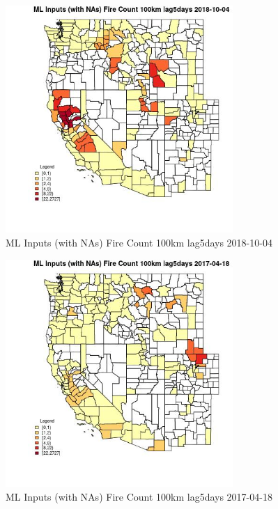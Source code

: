 \begin{figure} 
\centering  
\includegraphics[width=0.77\textwidth]{Code_Outputs/Report_ML_input_PM25_Step4_part_f_de_duplicated_aves_prioritize_24hr_obswNAs_CountyFire_Count_100km_lag5daysMean2018-10-04.jpg} 
\caption{\label{fig:Report_ML_input_PM25_Step4_part_f_de_duplicated_aves_prioritize_24hr_obswNAsCountyFire_Count_100km_lag5daysMean2018-10-04}ML Inputs (with NAs) Fire Count 100km lag5days 2018-10-04} 
\end{figure} 
 

\begin{figure} 
\centering  
\includegraphics[width=0.77\textwidth]{Code_Outputs/Report_ML_input_PM25_Step4_part_f_de_duplicated_aves_prioritize_24hr_obswNAs_CountyFire_Count_100km_lag5daysMean2017-04-18.jpg} 
\caption{\label{fig:Report_ML_input_PM25_Step4_part_f_de_duplicated_aves_prioritize_24hr_obswNAsCountyFire_Count_100km_lag5daysMean2017-04-18}ML Inputs (with NAs) Fire Count 100km lag5days 2017-04-18} 
\end{figure} 
 

